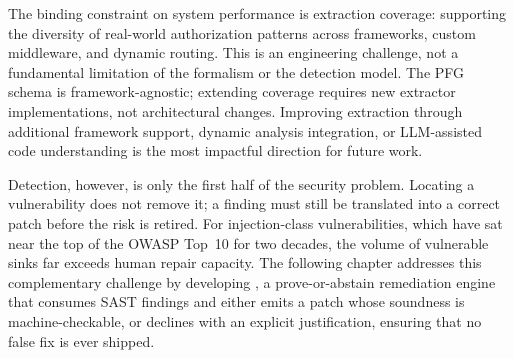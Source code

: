 The binding constraint on system performance is extraction coverage:
supporting the diversity of real-world authorization patterns across
frameworks, custom middleware, and dynamic routing. This is an engineering
challenge, not a fundamental limitation of the formalism or the detection
model. The PFG schema is framework-agnostic; extending coverage requires
new extractor implementations, not architectural changes. Improving
extraction through additional framework support, dynamic analysis
integration, or LLM-assisted code understanding is the most impactful
direction for future work.

Detection, however, is only the first half of the security problem.
Locating a vulnerability does not remove it; a finding must still be
translated into a correct patch before the risk is retired. For
injection-class vulnerabilities, which have sat near the top of the OWASP
Top~10 for two decades, the volume of vulnerable sinks far exceeds human
repair capacity. The following chapter addresses this complementary
challenge by developing \irsam{}, a prove-or-abstain remediation engine
that consumes SAST findings and either emits a patch whose soundness is
machine-checkable, or declines with an explicit justification, ensuring
that no false fix is ever shipped.

